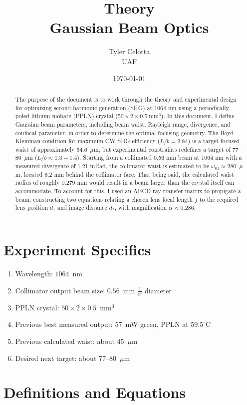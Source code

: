 \documentclass[11pt, letterpaper]{article}
\title{\textbf{Theory}\\ \large Gaussian Beam Optics}
\author{Tyler Celotta \\ UAF}
\date{\today}
\begin{document}
\maketitle
\thispagestyle{fancy}
\begin{abstract}
    The purpose of the document is to work through the theory and experimental design for optimizing second-harmonic generation (SHG) at 1064 nm using a periodically poled lithium niobate (PPLN) crystal ($50 \times 2 \times 0.5~\text{mm}^3$). In this document, I define Gaussian beam parameters, including beam waist, Rayleigh range, divergence, and confocal parameter, in order to determine the optimal focusing geometry. The Boyd-Kleinman condition for maximum CW SHG efficiency ($L/b = 2.84$) is a target focused waist of approximately 54.6~$\mu$m, but experimental constraints redefines a target of 77--80~$\mu$m ($L/b \approx 1.3-1.4$). Starting from a collimated 0.56 mm beam at 1064 nm with a measured divergence of 1.21 mRad, the collimator waist is estimated to be $\omega_{01} \approx 280$~$\mu$m, located 6.2 mm behind the collimator face. That being said, the calculated waist radius of roughly 0.279 mm would result in a beam larger than the crystal itself can accommodate. To account for this, I used an ABCD ray-transfer matrix to propigate a beam, constructing two equations relating a chosen lens focal length $f$ to the required lens position $d_{1}$ and image distance $d_{2}$, with magnification $\alpha \approx 0.286$.
\end{abstract}

\section{Experiment Specifics}
\begin{enumerate}
    \item Wavelength: $1064$~nm
    \item Collimator output beam size: $0.56$~mm $\frac{1}{e^2}$ diameter
    \item PPLN crystal: $50 \times 2 \times 0.5$~mm$^3$
    \item Previous best measured output: $57$~mW green, PPLN at $59.5^{\circ}$C
    \item Previous calculated waist: about $45$~$\mu$m
    \item Desired next target: about $77$--$80$~$\mu$m
\end{enumerate}

\section{Definitions and Equations}
\end{document}
